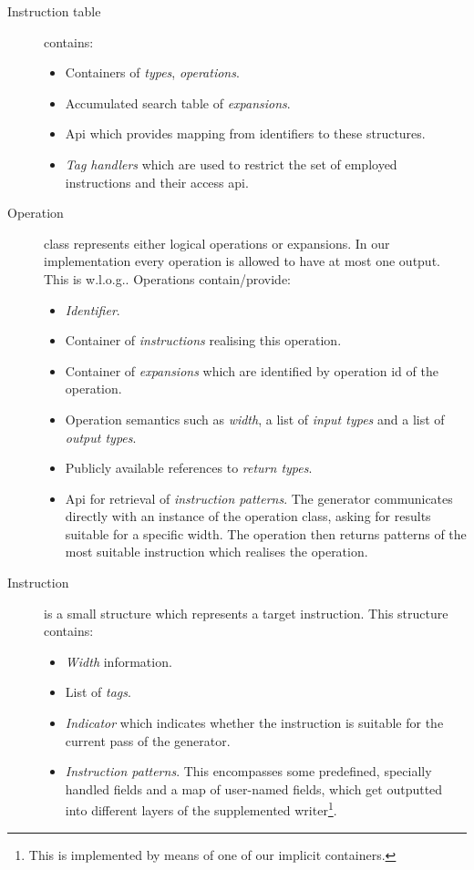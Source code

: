 \begin{description}
  \item[Instruction table] contains:
    \begin{itemize}
      \item Containers of \emph{types}, \emph{operations}.
      \item Accumulated search table of \emph{expansions}.
      \item Api which provides mapping from identifiers to these structures.
      \item \emph{Tag handlers} which are used to restrict the set of employed instructions and their access api.
    \end{itemize}
  \item[Operation] class represents either logical operations or expansions. In our implementation every operation is allowed to have at most one output. This is w.l.o.g.. Operations contain/provide:
    \begin{itemize}
      \item \emph{Identifier}.
      \item Container of \emph{instructions} realising this operation.
      \item Container of \emph{expansions} which are identified by operation id of the operation.
      \item Operation semantics such as \emph{width}, a list of \emph{input types} and a list of \emph{output types}.
      \item Publicly available references to \emph{return types}.
      \item Api for retrieval of \emph{instruction patterns}. The generator communicates directly with an instance of the operation class, asking for results suitable for a specific width. The operation then returns patterns of the most suitable instruction which realises the operation.
    \end{itemize} 
  \item[Instruction] is a small structure which represents a target instruction. This structure contains:
    \begin{itemize}
      \item \emph{Width} information.
      \item List of \emph{tags}.
      \item \emph{Indicator} which indicates whether the instruction is suitable for the current pass of the generator.
      \item \emph{Instruction patterns}. This encompasses some predefined, specially handled fields and a map of user-named fields, which get outputted into different layers of the supplemented writer\footnote{This is implemented by means of one of our implicit containers.}.

\end{itemize}
\end{description}
